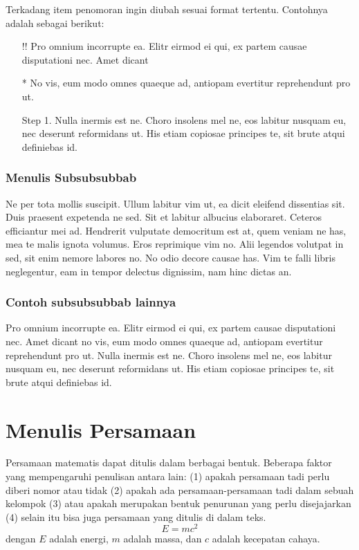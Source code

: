 Terkadang item penomoran ingin diubah sesuai format tertentu. Contohnya adalah sebagai berikut:
\begin{itemize}
    \item[!!] Pro omnium incorrupte ea. Elitr eirmod ei qui, ex partem causae disputationi nec. Amet dicant
    \item[*] No vis, eum modo omnes quaeque ad, antiopam evertitur reprehendunt pro ut.
    \item[Step 1.] Nulla inermis est ne. Choro insolens mel ne, eos labitur nusquam eu, nec deserunt reformidans ut. His etiam copiosae principes te, sit brute atqui definiebas id.
\end{itemize}


\subsubsection{Menulis Subsubsubbab}
Ne per tota mollis suscipit. Ullum labitur vim ut, ea dicit eleifend dissentias sit. Duis praesent expetenda ne sed. Sit et labitur albucius elaboraret. Ceteros efficiantur mei ad. Hendrerit vulputate democritum est at, quem veniam ne has, mea te malis ignota volumus. Eros reprimique vim no. Alii legendos volutpat in sed, sit enim nemore labores no. No odio decore causae has. Vim te falli libris neglegentur, eam in tempor delectus dignissim, nam hinc dictas an.

\subsubsection{Contoh subsubsubbab lainnya}
Pro omnium incorrupte ea. Elitr eirmod ei qui, ex partem causae disputationi nec. Amet dicant no vis, eum modo omnes quaeque ad, antiopam evertitur reprehendunt pro ut. Nulla inermis est ne. Choro insolens mel ne, eos labitur nusquam eu, nec deserunt reformidans ut. His etiam copiosae principes te, sit brute atqui definiebas id.



\section{Menulis Persamaan}
\noindent Persamaan matematis dapat ditulis dalam berbagai bentuk. Beberapa faktor yang mempengaruhi penulisan antara lain: (1) apakah persamaan tadi perlu diberi nomor atau tidak (2) apakah ada persamaan-persamaan tadi dalam sebuah kelompok (3) atau apakah merupakan bentuk penurunan yang perlu disejajarkan (4) selain itu bisa juga persamaan yang ditulis di dalam teks.
\begin{equation}
E=mc^2
\end{equation}
    dengan $E$ adalah energi, $m$ adalah massa, dan $c$ adalah kecepatan cahaya.

